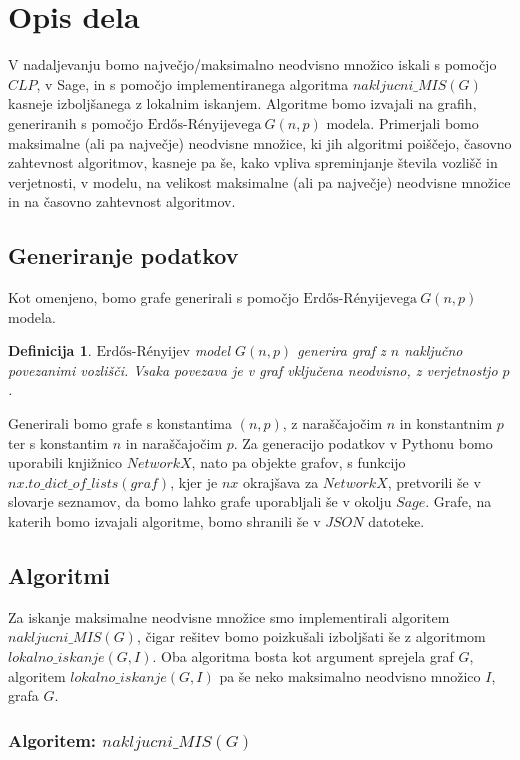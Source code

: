 \documentclass[a4paper, 12pt]{article}
\newtheorem{definicija}{Definicija}
\begin{document}
\newpage

\section{Opis dela}
V nadaljevanju bomo največjo/maksimalno neodvisno množico iskali s pomočjo $CLP$, v Sage, in s pomočjo implementiranega algoritma $nakljucni\_MIS(G)$ kasneje izboljšanega z lokalnim
iskanjem. Algoritme bomo izvajali na grafih, generiranih s pomočjo $\text{Erdős-Rényijevega}\ G(n,p)$ modela. Primerjali bomo maksimalne (ali pa največje) neodvisne množice, ki jih algoritmi poiščejo,
časovno zahtevnost algoritmov, kasneje pa še, kako vpliva spreminjanje števila vozlišč in verjetnosti, v modelu, na velikost maksimalne (ali pa največje) neodvisne množice in na
časovno zahtevnost algoritmov.

\subsection{Generiranje podatkov}
Kot omenjeno, bomo grafe generirali s pomočjo $\text{Erdős-Rényijevega}\ G(n,p)$ modela.

\begin{definicija}
    $\text{Erdős-Rényijev}$ model $G(n, p)$ generira graf z $n$ naključno povezanimi vozlišči. Vsaka povezava je v graf vključena neodvisno, z verjetnostjo $p$.
\end{definicija}

Generirali bomo grafe s konstantima $(n,p)$, z naraščajočim $n$ in konstantnim $p$ ter s konstantim $n$ in naraščajočim $p$. Za generacijo podatkov v Pythonu bomo uporabili
knjižnico $NetworkX$, nato pa objekte grafov, s funkcijo $nx.to\_dict\_of\_lists(graf)$, kjer je $nx$ okrajšava za $NetworkX$, pretvorili še v slovarje seznamov, da bomo lahko grafe uporabljali še v okolju $Sage$.
Grafe, na katerih bomo izvajali algoritme, bomo shranili še v $JSON$ datoteke.


\subsection{Algoritmi}

Za iskanje maksimalne neodvisne množice smo implementirali algoritem $nakljucni\_MIS(G)$, čigar rešitev bomo poizkušali izboljšati še z algoritmom $lokalno\_iskanje(G, I)$. Oba
algoritma bosta kot argument sprejela graf $G$, algoritem $lokalno\_iskanje(G, I)$ pa še neko maksimalno neodvisno množico $I$, grafa $G$.

\subsubsection{Algoritem: $nakljucni\_MIS(G)$}
\end{document}
